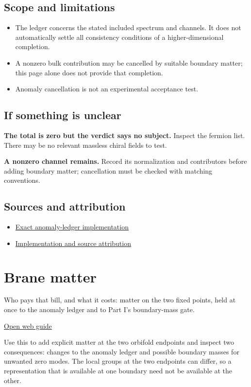 \documentclass[11pt,a4paper]{article}
\begin{document}
\subsection*{Scope and limitations}
\begin{itemize}
\item The ledger concerns the stated included spectrum and channels. It does not automatically settle all consistency conditions of a higher-dimensional completion.
\item A nonzero bulk contribution may be cancelled by suitable boundary matter; this page alone does not provide that completion.
\item Anomaly cancellation is not an experimental acceptance test.
\end{itemize}
\subsection*{If something is unclear}
\textbf{The total is zero but the verdict says no subject.} Inspect the fermion list. There may be no relevant massless chiral fields to test.

\textbf{A nonzero channel remains.} Record its normalization and contributors before adding boundary matter; cancellation must be checked with matching conventions.

\subsection*{Sources and attribution}
\begin{itemize}
\item \href{https://github.com/karlesmarin/ghu-lab/blob/main/src/modules/anomaly5d.mjs}{Exact anomaly-ledger implementation}
\item \href{https://github.com/karlesmarin/ghu-lab/blob/main/src/sections/anomaly5d_section.js}{Implementation and source attribution}
\end{itemize}
\section{Brane matter}
Who pays that bill, and what it costs: matter on the two fixed points, held at once to the anomaly ledger and to Part I's boundary-mass gate.

\href{https://karlesmarin.github.io/ghu-explorer/guide/brane/index.html}{Open web guide}

Use this to add explicit matter at the two orbifold endpoints and inspect two consequences: changes to the anomaly ledger and possible boundary masses for unwanted zero modes. The local groups at the two endpoints can differ, so a representation that is available at one boundary need not be available at the other.
\end{document}
